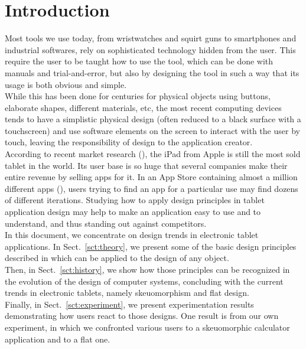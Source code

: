 \documentclass[a4paper,11pt] {article}
\theoremstyle{definition}
\begin{document}
\section{Introduction}

Most tools we use today, from wristwatches and squirt guns to smartphones and industrial softwares, rely on sophisticated technology hidden from the user. This require the user to be taught how to use the tool, which can be done with manuals and trial-and-error, but also by designing the tool in such a way that its usage is both obvious and simple.\\

While this has been done for centuries for physical objects using buttons, elaborate shapes, different materials, etc, the most recent computing devices tends to have a simplistic physical design (often reduced to a black surface with a touchscreen) and use software elements on the screen to interact with the user by touch, leaving the responsibility of design to the application creator.\\

According to recent market research (\cite{ABI-android}), the iPad from Apple is still the most sold tablet in the world. Its user base is so huge that several companies make their entire revenue by selling apps for it. In an App Store containing almost a million different apps (\cite{iOs61}), users trying to find an app for a particular use may find dozens of different iterations. Studying how to apply design principles in tablet application design may help to make an application easy to use and to understand, and thus standing out against competitors.\\

In this document, we concentrate on design trends in electronic tablet applications. In Sect.~\ref{sct:theory}, we present some of the basic design principles described in \cite{Norman02} which can be applied to the design of any object.\\

Then, in Sect.~\ref{sct:history}, we show how those principles can be recognized in the evolution of the design of computer systems, concluding with the current trends in electronic tablets, namely skeuomorphism and flat design.\\

Finally, in Sect.~\ref{sct:experiment}, we present experimentation results demonstrating how users react to those designs. One result is from our own experiment, in which we confronted various users to a skeuomorphic calculator application and to a flat one.\\
\end{document}
